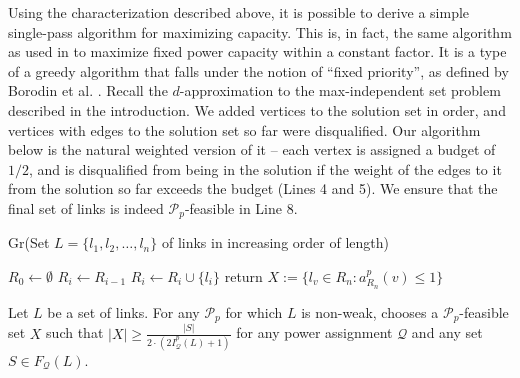 \documentclass[11pt]{amsart}
\newcommand{\cal}[1]{\mathcal{#1}}
\def\calP{{\cal P}}
\def\calQ{{\cal Q}}
\def\SetR{R}
\def\calP{{\cal P}}   \def\calM{{\cal M}}   \def\calU{{\cal U}}   \newcommand{\PCopt}{\overline{OPT}}
\newcommand{\powp}{\calP_p}
\begin{document}
Using the characterization described above, it is possible to derive a simple single-pass
algorithm for maximizing capacity. This is, in fact, the same
algorithm as used in \cite{SODA11} to maximize fixed power capacity
within a constant factor. 
It is a type of a greedy algorithm that falls under the notion of ``fixed priority'', as defined by 
Borodin et al. \cite{BorodinPriority}.
Recall the $d$-approximation to the max-independent set problem described in the introduction. We added vertices to
the solution set in order, and vertices with edges to the solution set so far were disqualified. Our algorithm below is the natural weighted version of it -- each vertex is assigned a budget of $1/2$, and is disqualified from being in the solution
if the weight of the edges to it from the solution so far exceeds the budget (Lines 4 and 5). We ensure that the final set of links is indeed $\calP_p$-feasible in Line 8.




\begin{algorithm}                      \caption{Gr(Set $L=\{l_1,l_2,\ldots,l_n\}$ of links in increasing order of length)}          \label{alg1}                           \begin{algorithmic}[1]                    \STATE $\SetR_0 \gets \emptyset$
     \STATE $\SetR_i \gets \SetR_{i-1}$
     \IF{$\hat{b}^p_{\SetR_{i-1}}(l_i) < 1/2$} \label{alg:acceptance}
     	\STATE $\SetR_i \gets \SetR_i \cup \{l_i\}$
     \ENDIF
     \ENDFOR
     \STATE return $X := \{l_v\in \SetR_n : a_{\SetR_n}^p(v)\le 1\}$
\end{algorithmic}
\label{alg1fig}
\end{algorithm}


\begin{theorem}
Let $L$ be a set of links.
For any $\powp$ for which $L$ is non-weak,  chooses a $\powp$-feasible set $X$ 
such that 
$|X| \ge \frac{|S|}{2\cdot( 2 I^p_{\calQ}(L) + 1)}$ for any power assignment $\calQ$ and any set $S \in F_{\calQ}(L)$.
\label{thm:appx}
\end{theorem}
\end{document}
